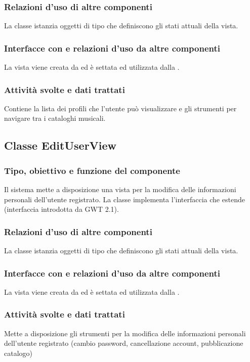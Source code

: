 \subsubsection*{Relazioni d'uso di altre componenti} 
La classe istanzia oggetti di tipo  che definiscono gli stati
attuali della vista.
\subsubsection*{Interfacce con e relazioni d'uso da altre componenti}
 La vista viene creata da  ed \`e settata ed utilizzata dalla
 .
 \subsubsection*{Attivit\`a svolte e dati trattati}
Contiene la lista dei profili che l'utente pu\`o visualizzare e gli strumenti
per navigare tra i cataloghi musicali.

\subsection{Classe EditUserView}
\subsubsection*{Tipo, obiettivo e funzione del componente}
Il sistema mette a disposizione una vista per la
modifica delle informazioni personali dell'utente registrato. La classe
 implementa l'interfaccia  che estende
 (interfaccia introdotta da GWT 2.1).

\subsubsection*{Relazioni d'uso di altre componenti}
La classe istanzia oggetti di tipo  che definiscono gli stati
attuali della vista.
\subsubsection*{Interfacce con e relazioni d'uso da altre componenti}
La vista viene creata da  ed \`e settata ed utilizzata dalla
.
\subsubsection*{Attivit\`a svolte e dati trattati}
Mette a disposizione gli strumenti per la modifica delle informazioni personali
dell'utente registrato (cambio password, cancellazione account,
pubblicazione catalogo)
 
